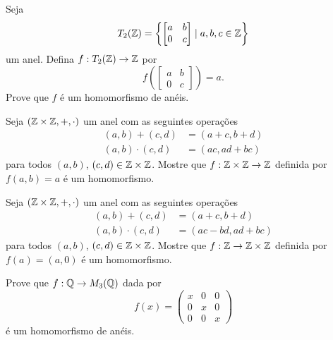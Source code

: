 \documentclass[12pt]{exam}
\begin{document}
    \questao{} Seja
    \[
        T_2(\mathbb{Z}) = \left\{\begin{bmatrix}a & b\\ 0 & c\end{bmatrix} \mid a, b, c \in \mathbb{Z}\right\}
    \]
    um anel. Defina $f : T_2(\mathbb{Z}) \to \mathbb{Z}$ por
    \[
        f\left(\begin{bmatrix}a & b\\ 0 & c\end{bmatrix}\right) = a.
    \]
    Prove que $f$ é um homomorfismo de anéis.

    \vspace{.3cm}

    \questao{} Seja $(\mathbb{Z}\times\mathbb{Z}, +, \cdot)$ um anel com as seguintes operações
    \begin{align*}
        (a, b) + (c, d) &= (a + c, b + d)\\
        (a, b)\cdot (c, d) &= (ac, ad + bc)
    \end{align*}
    para todos $(a, b)$, $(c, d) \in \mathbb{Z}\times\mathbb{Z}$.
    Mostre que $ f : \mathbb{Z}\times\mathbb{Z} \to \mathbb{Z}$ definida por $f(a, b) = a$ é um homomorfismo.

    \vspace{.3cm}

    \questao{} Seja $(\mathbb{Z}\times\mathbb{Z}, +, \cdot)$ um anel com as seguintes operações
    \begin{align*}
        (a, b) + (c, d) &= (a + c, b + d)\\
        (a, b)\cdot (c, d) &= (ac - bd, ad + bc)
    \end{align*}
    para todos $(a, b)$, $(c, d) \in \mathbb{Z}\times\mathbb{Z}$.
    Mostre que $ f : \mathbb{Z} \to \mathbb{Z}\times\mathbb{Z}$ definida por $f(a) = (a, 0)$ é um homomorfismo.

    \vspace{.3cm}

    \questao{} Prove que $f : \mathbb{Q} \to M_3(\mathbb{Q})$ dada por
    \[
        f(x) = \begin{pmatrix}
            x & 0 & 0\\
            0 & x & 0\\
            0 & 0 & x
        \end{pmatrix}
    \]
    é um homomorfismo de anéis.

    \newpage
\end{document}
